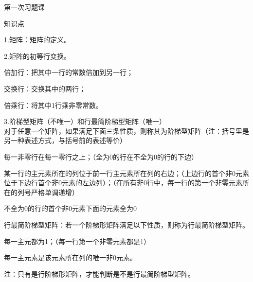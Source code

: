 \documentclass{article}
\begin{document}
 \renewcommand{\thenum}{\arabic{num}.} \newcommand{\num}{\refstepcounter{num}\text{\thenum}}

\hphantom{~~}\hfill {\heiti 第一次习题课} \hfill\hphantom{~~}

\hphantom{~~}\hfill {\heiti 知识点} \hfill\hphantom{~~}

1.矩阵：矩阵的定义。

2.矩阵的初等行变换。
\begin{asparaenum}[(1)]
\item 倍加行：把其中一行的常数倍加到另一行；
\item 交换行：交换其中的两行；
\item 倍乘行：将其中1行乘非零常数。
\end{asparaenum}

3.阶梯型矩阵（不唯一）和行最简阶梯型矩阵（唯一）\\
对于任意一个矩阵，如果满足下面三条性质，则称其为\textcolor[rgb]{1.00,0.00,0.00}{阶梯型矩阵}（注：括号里是另一种表述方式，与括号前的表述等价）
\begin{asparaenum}[(1)]
\item 每一非零行在每一零行之上；（全为0的行在不全为0的行的下边）
\item 某一行的主元素所在的列位于前一行主元素所在列的右边；（上边行的首个非0元素位于下边行首个非0元素的左边列）；（在所有非0行中，每一行的第一个非零元素所在的列号严格单调递增）
\item 不全为0的行的首个非0元素下面的元素全为0
\end{asparaenum}
行最简阶梯型矩阵：若一个阶梯形矩阵满足以下性质，则称为\textcolor[rgb]{1.00,0.00,0.00}{行最简阶梯型矩阵}。
\begin{asparaenum}[(1)]
\item 每一主元都为1；（每一行第一个非零元素都是1）
\item 每一主元素是该元素所在列的唯一非0元素。
\end{asparaenum}
注：只有是行阶梯形矩阵，才能判断是不是行最简阶梯型矩阵。
\end{document}
